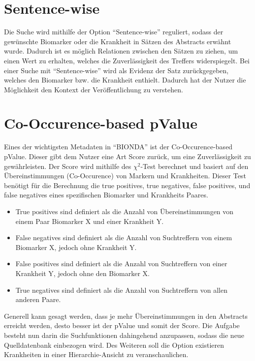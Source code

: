 \section*{Sentence-wise}
Die Suche wird mithilfe der Option \enquote{Sentence-wise} reguliert, sodass der gewünschte Biomarker oder die Krankheit in Sätzen des Abstracts erwähnt wurde. Dadurch ist es möglich Relationen zwischen den Sätzen zu ziehen, um einen Wert zu erhalten, welches die Zuverlässigkeit des Treffers widerspiegelt. Bei einer Suche mit \enquote{Sentence-wise} wird als Evidenz der Satz zurückgegeben, welches den Biomarker bzw. die Krankheit enthielt. Dadurch hat der Nutzer die Möglichkeit den Kontext der Veröffentlichung zu verstehen.

\section*{Co-Occurence-based pValue}
Eines der wichtigsten Metadaten in \enquote{BIONDA} ist der Co-Occurence-based pValue. Dieser gibt dem Nutzer eine Art Score zurück, um eine Zuverlässigkeit zu gewährleisten. Der Score wird mithilfe des $\chi ^{2}$-Test berechnet und basiert auf den Übereinstimmungen (Co-Occurence) von Markern und Krankheiten. Dieser Test benötigt für die Berechnung die true positives, true negatives, false positives, und false negatives eines spezifischen Biomarker und Krankheits Paares.

\begin{itemize}
\item{True positives sind definiert als die Anzahl von Übereinstimmungen von einem Paar Biomarker X und einer Krankheit Y.
} 
\item{False negatives sind definiert als die Anzahl von Suchtreffern von einem Biomarker X, jedoch ohne Krankheit Y.
} 
\item{False positives sind definiert als die Anzahl von Suchtreffern von einer Krankheit Y, jedoch ohne den Biomarker X.
} 
\item{True negatives sind definiert als die Anzahl von Suchtreffern von allen anderen Paare.
} 
\end{itemize}

Generell kann gesagt werden, dass je mehr Übereinstimmungen in den Abstracts erreicht werden, desto besser ist der pValue und somit der Score. Die Aufgabe besteht nun darin die Suchfunktionen dahingehend anzupassen, sodass die neue Quelldatenbank einbezogen wird. Des Weiteren soll die Option existieren Krankheiten in einer Hierarchie-Ansicht zu veranschaulichen.